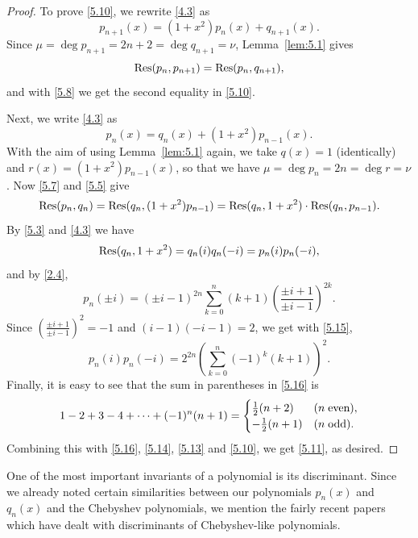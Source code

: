 \documentclass{amsart}
\theoremstyle{plain}
\numberwithin{equation}{section}
\begin{document}
\begin{proof} 
To prove \eqref{5.10}, we rewrite \eqref{4.3} as
\[
p_{n+1}(x)=(1+x^2)p_n(x)+q_{n+1}(x).
\]
Since $\mu=\deg{p_{n+1}}=2n+2=\deg{q_{n+1}}=\nu$, Lemma~\ref{lem:5.1} gives
\[
{\rm Res}(p_n, p_{n+1}) = {\rm Res}(p_n, q_{n+1}),
\]
and with \eqref{5.8} we get the second equality in \eqref{5.10}.

Next, we write \eqref{4.3} as
\[
p_n(x)=q_n(x)+(1+x^2)p_{n-1}(x).
\]
With the aim of using Lemma~\ref{lem:5.1} again, we take $q(x)=1$ (identically)
and $r(x)=(1+x^2)p_{n-1}(x)$, so that we have $\mu=\deg{p_n}=2n=\deg{r}=\nu$.
Now \eqref{5.7} and \eqref{5.5} give
\begin{equation}\label{5.13}
{\rm Res}(p_n, q_n) = {\rm Res}(q_n, (1+x^2)p_{n-1})
={\rm Res}(q_n, 1+x^2)\cdot {\rm Res}(q_n, p_{n-1}).
\end{equation}
By \eqref{5.3} and \eqref{4.3} we have
\begin{equation}\label{5.14}
{\rm Res}(q_n, 1+x^2)=q_n(i)q_n(-i) = p_n(i)p_n(-i),
\end{equation}
and by \eqref{2.4}, 
\begin{equation}\label{5.15}
p_n(\pm i) = (\pm i-1)^{2n}\sum_{k=0}^n(k+1)
\left(\frac{\pm i+1}{\pm i-1}\right)^{2k}.
\end{equation}
Since $(\frac{\pm i+1}{\pm i-1})^2=-1$ and $(i-1)(-i-1)=2$, we get with
\eqref{5.15},
\begin{equation}\label{5.16}
p_n(i)p_n(-i) = 2^{2n}\left(\sum_{k=0}^n(-1)^k(k+1)\right)^2.
\end{equation}
Finally, it is easy to see that the sum in parentheses in \eqref{5.16} is
\[
1-2+3-4+\cdots+(-1)^n(n+1) = \begin{cases}
\tfrac{1}{2}(n+2) & (n\; \hbox{even}),\\
-\tfrac{1}{2}(n+1) & (n\; \hbox{odd}).
\end{cases}
\]
Combining this with \eqref{5.16}, \eqref{5.14}, \eqref{5.13} and \eqref{5.10},
we get \eqref{5.11}, as desired.
\end{proof}

One of the most important invariants of a polynomial is its discriminant. Since
we already noted certain similarities between our polynomials $p_n(x)$ and
$ q_n(x)$ and the Chebyshev polynomials, we mention the fairly recent papers
\cite{DS, DU, GI, St, Tr1, Tr2} which have dealt with discriminants of
Chebyshev-like polynomials.
\end{document}
